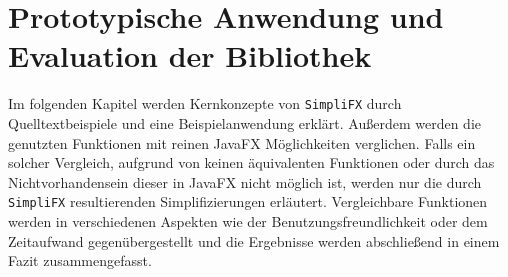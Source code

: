 \chapter{Prototypische Anwendung und Evaluation der Bibliothek}
\label{evaluation}
Im folgenden Kapitel werden Kernkonzepte von \texttt{SimpliFX} durch Quelltextbeispiele und eine Beispielanwendung erklärt. Außerdem werden die genutzten Funktionen mit reinen JavaFX Möglichkeiten verglichen. Falls ein solcher Vergleich, aufgrund von keinen äquivalenten Funktionen oder durch das Nichtvorhandensein dieser in JavaFX nicht möglich ist, werden nur die durch \texttt{SimpliFX} resultierenden Simplifizierungen erläutert. Vergleichbare Funktionen werden in verschiedenen Aspekten wie der Benutzungsfreundlichkeit oder dem Zeitaufwand gegenübergestellt und die Ergebnisse werden abschließend in einem Fazit zusammengefasst.
